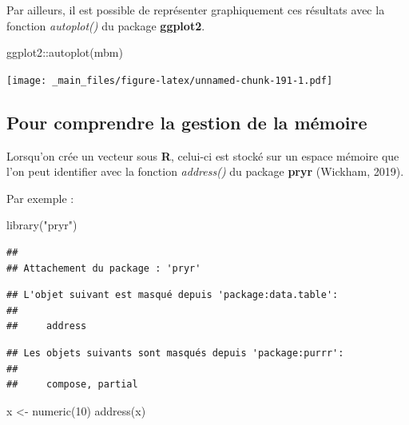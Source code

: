 \documentclass[
]{book}
\newenvironment{Shaded}{\begin{snugshade}}{\end{snugshade}}
\newcommand{\DecValTok}[1]{\textcolor[rgb]{0.00,0.00,0.81}{#1}}
\newcommand{\FunctionTok}[1]{\textcolor[rgb]{0.00,0.00,0.00}{#1}}
\newcommand{\NormalTok}[1]{#1}
\newcommand{\OtherTok}[1]{\textcolor[rgb]{0.56,0.35,0.01}{#1}}
\newcommand{\SpecialCharTok}[1]{\textcolor[rgb]{0.00,0.00,0.00}{#1}}
\newcommand{\StringTok}[1]{\textcolor[rgb]{0.31,0.60,0.02}{#1}}
\theoremstyle{definition}
\theoremstyle{definition}
\theoremstyle{definition}
\theoremstyle{definition}
\theoremstyle{remark}
\begin{document}
Par ailleurs, il est possible de représenter graphiquement ces résultats avec la fonction \emph{autoplot()} du package \textbf{ggplot2}.

\begin{Shaded}
\begin{Highlighting}[]
\NormalTok{ggplot2}\SpecialCharTok{::}\FunctionTok{autoplot}\NormalTok{(mbm)}
\end{Highlighting}
\end{Shaded}

\texttt{[image: \_main\_files/figure-latex/unnamed-chunk-191-1.pdf]}

\hypertarget{pour-comprendre-la-gestion-de-la-muxe9moire}{%
\subsection{Pour comprendre la gestion de la mémoire}\label{pour-comprendre-la-gestion-de-la-muxe9moire}}

Lorsqu'on crée un vecteur sous \textbf{R}, celui-ci est stocké sur un espace mémoire que l'on peut identifier avec la fonction \emph{address()} du package \textbf{pryr} (Wickham, 2019).

Par exemple :

\begin{Shaded}
\begin{Highlighting}[]
\FunctionTok{library}\NormalTok{(}\StringTok{"pryr"}\NormalTok{)}
\end{Highlighting}
\end{Shaded}

\begin{verbatim}
## 
## Attachement du package : 'pryr'
\end{verbatim}

\begin{verbatim}
## L'objet suivant est masqué depuis 'package:data.table':
## 
##     address
\end{verbatim}

\begin{verbatim}
## Les objets suivants sont masqués depuis 'package:purrr':
## 
##     compose, partial
\end{verbatim}

\begin{Shaded}
\begin{Highlighting}[]
\NormalTok{x }\OtherTok{\textless{}{-}} \FunctionTok{numeric}\NormalTok{(}\DecValTok{10}\NormalTok{)}
\FunctionTok{address}\NormalTok{(x)}
\end{Highlighting}
\end{Shaded}
\end{document}
